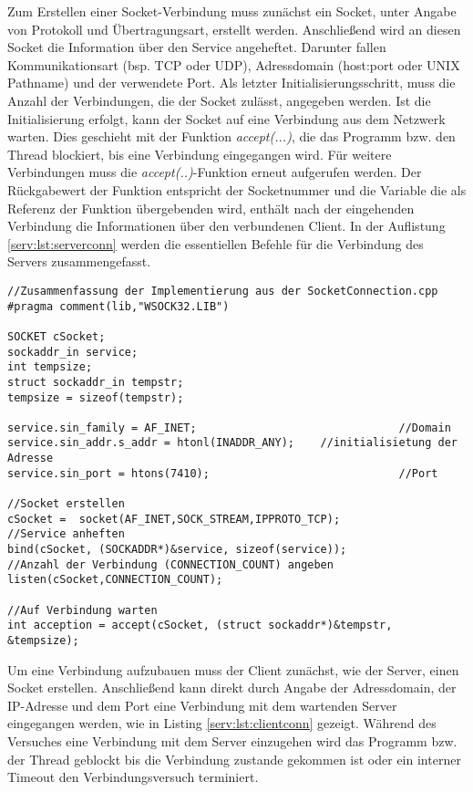 Zum Erstellen einer Socket-Verbindung muss zunächst ein Socket, unter Angabe
von Protokoll und Übertragungsart, erstellt werden. Anschließend wird an diesen
Socket die Information über den Service angeheftet. Darunter fallen Kommunikationsart (bsp. TCP oder UDP), Adressdomain (host:port oder UNIX Pathname) und der verwendete Port. Als letzter Initialisierungsschritt, muss die Anzahl der Verbindungen, die der Socket zulässt, angegeben werden. Ist die Initialisierung erfolgt, kann der Socket auf eine Verbindung aus dem Netzwerk warten. Dies geschieht mit der Funktion {\it accept(...)}, die das Programm bzw. den Thread blockiert, bis eine Verbindung eingegangen wird. Für weitere Verbindungen muss die {\it accept(..)}-Funktion erneut aufgerufen werden. Der Rückgabewert der Funktion entspricht der Socketnummer und die Variable die als Referenz der Funktion übergebenden wird, enthält nach der eingehenden Verbindung die Informationen über den verbundenen Client. In der Auflistung \ref{serv:lst:serverconn} werden die essentiellen Befehle für die Verbindung des Servers zusammengefasst.

\begin{lstlisting}[frame=tb,captionpos=b,caption=Socket Connection - Server., label=serv:lst:serverconn]
//Zusammenfassung der Implementierung aus der SocketConnection.cpp
#pragma comment(lib,"WSOCK32.LIB")

SOCKET cSocket;
sockaddr_in service;
int tempsize;
struct sockaddr_in tempstr;
tempsize = sizeof(tempstr);	

service.sin_family = AF_INET; 								//Domain								
service.sin_addr.s_addr = htonl(INADDR_ANY);	//initialisietung der Adresse
service.sin_port = htons(7410);								//Port

//Socket erstellen
cSocket =  socket(AF_INET,SOCK_STREAM,IPPROTO_TCP); 			
//Service anheften
bind(cSocket, (SOCKADDR*)&service, sizeof(service)); 
//Anzahl der Verbindung (CONNECTION_COUNT) angeben
listen(cSocket,CONNECTION_COUNT);														

//Auf Verbindung warten
int acception = accept(cSocket, (struct sockaddr*)&tempstr, &tempsize); 

\end{lstlisting}

Um eine Verbindung aufzubauen muss der Client zunächst, wie der Server, einen Socket erstellen. Anschließend kann direkt durch Angabe der Adressdomain, der IP-Adresse und dem Port eine Verbindung mit dem wartenden Server eingegangen werden, wie in Listing \ref{serv:lst:clientconn} gezeigt. Während des Versuches eine Verbindung mit dem Server einzugehen wird das Programm bzw. der Thread geblockt bis die Verbindung zustande gekommen ist oder ein interner Timeout den Verbindungsversuch terminiert.

